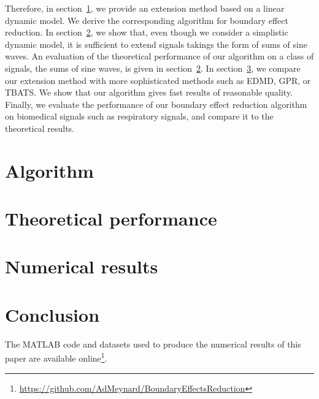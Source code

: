 \documentclass[journal]{IEEEtran}
\begin{document}
Therefore, in section~\ref{se:algo}, we provide an extension method based on a linear dynamic model. We derive the corresponding algorithm for boundary effect reduction. In section~\ref{se:theoretical}, we show that, even though we consider a simplistic dynamic model, it is sufficient to extend signals takings the form of sums of sine waves. An evaluation of the theoretical performance of our algorithm on a class of signals, the sums of sine waves, is given in section~\ref{se:theoretical}. In section~\ref{se:results}, we compare our extension method with more sophisticated methods such as EDMD, GPR, or TBATS. We show that our algorithm gives fast results of reasonable quality. Finally, we evaluate the performance of our boundary effect reduction algorithm on biomedical signals such as respiratory signals, and compare it to the theoretical results. 

\section{Algorithm}
\label{se:algo}



\section{Theoretical performance}
\label{se:theoretical}


\section{Numerical results}
\label{se:results}


{\color{red}
\section{Conclusion}
\label{se:conclusion}
The MATLAB code and datasets used to produce the numerical results of this paper are available online\footnote{\url{https://github.com/AdMeynard/BoundaryEffectsReduction}}.
}

%





%
\end{document}

